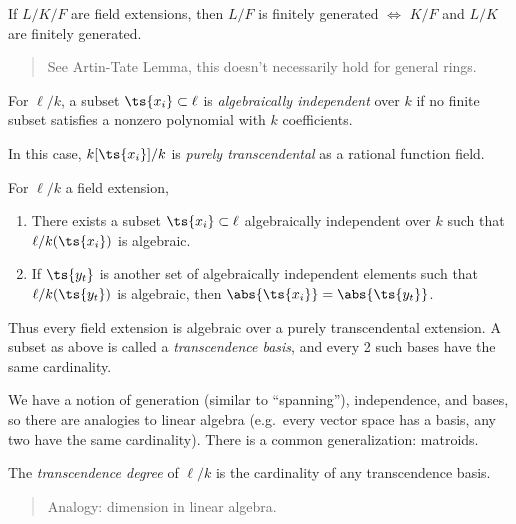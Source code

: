 \begin{theorem}

If \(L/K/F\) are field extensions, then \(L/F\) is finitely generated
\(\iff\) \(K/F\) and \(L/K\) are finitely generated.

\end{theorem}

\begin{quote}
See Artin-Tate Lemma, this doesn't necessarily hold for general rings.
\end{quote}

\begin{definition}

For \(\ell/k\), a subset \(\ts{x_i}\subset \ell\) is \emph{algebraically
independent} over \(k\) if no finite subset satisfies a nonzero
polynomial with \(k\) coefficients.

In this case, \(k[\ts{x_i}] / k\) is \emph{purely transcendental} as a
rational function field.

\end{definition}

\begin{theorem}[?]

For \(\ell/k\) a field extension,

\begin{enumerate}
\def\labelenumi{\alph{enumi}.}
\item
  There exists a subset \(\ts{x_i}\subset \ell\) algebraically
  independent over \(k\) such that \(\ell/k(\ts{x_i})\) is algebraic.
\item
  If \(\ts{y_t}\) is another set of algebraically independent elements
  such that \(\ell/k(\ts{y_t})\) is algebraic, then
  \(\abs{\ts{x_i}} = \abs{\ts{y_t}}\).
\end{enumerate}

\end{theorem}

Thus every field extension is algebraic over a purely transcendental
extension. A subset as above is called a \emph{transcendence basis}, and
every 2 such bases have the same cardinality.

We have a notion of generation (similar to ``spanning''), independence,
and bases, so there are analogies to linear algebra (e.g.~every vector
space has a basis, any two have the same cardinality). There is a common
generalization: matroids.

\begin{definition}

The \emph{transcendence degree} of \(\ell/k\) is the cardinality of any
transcendence basis.

\begin{quote}
Analogy: dimension in linear algebra.
\end{quote}

\end{definition}

